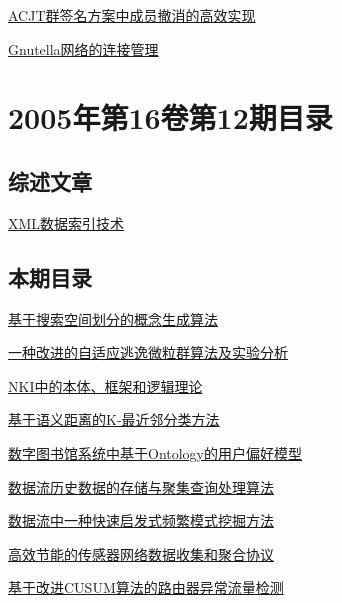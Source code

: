 \documentclass[a4paper]{article}
\begin{document}
\href{http://www.jos.org.cn/ch/reader/download_pdf.aspx?file_no=20050117&year_id=2005&quarter_id=1&falg=1}{ACJT群签名方案中成员撤消的高效实现}

\href{http://www.jos.org.cn/ch/reader/download_pdf.aspx?file_no=20050118&year_id=2005&quarter_id=1&falg=1}{Gnutella网络的连接管理}


\section{\textbf{2005年第16卷第12期目录}}
\subsection{综述文章}
\href{http://www.jos.org.cn/ch/reader/download_pdf.aspx?file_no=20051205&year_id=2005&quarter_id=12&falg=1}{XML数据索引技术}

\subsection{本期目录}
\href{http://www.jos.org.cn/ch/reader/download_pdf.aspx?file_no=20051201&year_id=2005&quarter_id=12&falg=1}{基于搜索空间划分的概念生成算法}

\href{http://www.jos.org.cn/ch/reader/download_pdf.aspx?file_no=20051202&year_id=2005&quarter_id=12&falg=1}{一种改进的自适应逃逸微粒群算法及实验分析}

\href{http://www.jos.org.cn/ch/reader/download_pdf.aspx?file_no=20051203&year_id=2005&quarter_id=12&falg=1}{NKI中的本体、框架和逻辑理论}

\href{http://www.jos.org.cn/ch/reader/download_pdf.aspx?file_no=20051204&year_id=2005&quarter_id=12&falg=1}{基于语义距离的K-最近邻分类方法}

\href{http://www.jos.org.cn/ch/reader/download_pdf.aspx?file_no=20051206&year_id=2005&quarter_id=12&falg=1}{数字图书馆系统中基于Ontology的用户偏好模型}

\href{http://www.jos.org.cn/ch/reader/download_pdf.aspx?file_no=20051207&year_id=2005&quarter_id=12&falg=1}{数据流历史数据的存储与聚集查询处理算法}

\href{http://www.jos.org.cn/ch/reader/download_pdf.aspx?file_no=20051208&year_id=2005&quarter_id=12&falg=1}{数据流中一种快速启发式频繁模式挖掘方法}

\href{http://www.jos.org.cn/ch/reader/download_pdf.aspx?file_no=20051209&year_id=2005&quarter_id=12&falg=1}{高效节能的传感器网络数据收集和聚合协议}

\href{http://www.jos.org.cn/ch/reader/download_pdf.aspx?file_no=20051210&year_id=2005&quarter_id=12&falg=1}{基于改进CUSUM算法的路由器异常流量检测}
\end{document}
